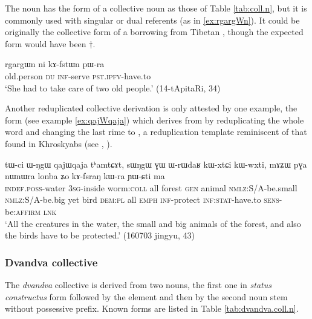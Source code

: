 The noun  has the form of a collective noun as those of Table \ref{tab:coll.n}, but it is commonly used with singular or dual referents (as in \ref{ex:rgargWn}). It could be originally the collective form of a borrowing from Tibetan , though the expected form would have been $\dagger$. 
 
\begin{exe}
\ex \label{ex:rgargWn}
\gll  rgargɯn ni kɤ-fstɯn pɯ-ra \\
old.person \textsc{du} \textsc{inf}-serve \textsc{pst.ipfv}-have.to \\
\glt `She had to take care of two old people.' (14-tApitaRi, 34)
\end{exe}

Another reduplicated collective derivation is only attested by one example, the form  (see example \ref{ex:qajWqaja}) which derives from   by reduplicating the  whole word and changing the last rime to , a reduplication template reminiscent of that found in Khroskyabs (see \citealt{lai13fuyin}, \citealt[22-24]{lai17khroskyabs}).

\begin{exe}
\ex \label{ex:qajWqaja}
\gll
tɯ-ci ɯ-ŋgɯ qajɯqaja tʰamtɕɤt, sɯŋgɯ ɣɯ ɯ-rɯdaʁ kɯ-xtɕi kɯ-wxti, mɤʑɯ pɣa nɯnɯra lonba ʑo kɤ-fsraŋ kɯ-ra ɲɯ-ɕti ma \\
\textsc{indef.poss}-water \textsc{3sg}-inside worm:\textsc{coll} all forest \textsc{gen} animal \textsc{nmlz}:S/A-be.small \textsc{nmlz}:S/A-be.big yet bird \textsc{dem:pl} all \textsc{emph} \textsc{inf}-protect \textsc{inf:stat}-have.to \textsc{sens}-be:\textsc{affirm} \textsc{lnk} \\
\glt `All the creatures in the water, the small and big animals of the forest, and also the birds have to be protected.' (160703 jingyu, 43)
\end{exe}


\subsubsection{Dvandva collective}
The \textit{dvandva} collective is derived from two nouns, the first one in \textit{status constructus} form followed by the element   and then by the second noun stem without possessive prefix. Known forms are listed in Table \ref{tab:dvandva.coll.n}.  

